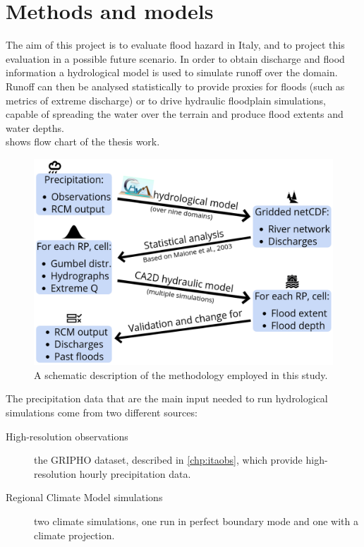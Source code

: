 \chapter{Methods and models} \label{chp:models}
The aim of this project is to evaluate flood hazard in Italy, and to project this evaluation in a possible future scenario.
In order to obtain discharge and flood information a hydrological model is used to simulate runoff over the domain.
Runoff can then be analysed statistically to provide proxies for floods (such as metrics of extreme discharge) or to drive hydraulic floodplain simulations, capable of spreading the water over the terrain and produce flood extents and water depths.\\
 shows flow chart of the thesis work.
\begin{figure}
    \centering
    \includegraphics[width=\textwidth]{figures/method}
    \decoRule
    \caption[Flowchart of the project methodology]{A schematic description of the methodology employed in this study.}
    \label{fig:method}
\end{figure}

The precipitation data that are the main input needed to run hydrological simulations come from two different sources:
\begin{description}
    \item[High-resolution observations] the GRIPHO dataset, described in \cref{chp:itaobs}, which provide high-resolution hourly precipitation data.
    \item[Regional Climate Model simulations] two climate simulations, one run in perfect boundary mode and one with a climate projection.
\end{description}

